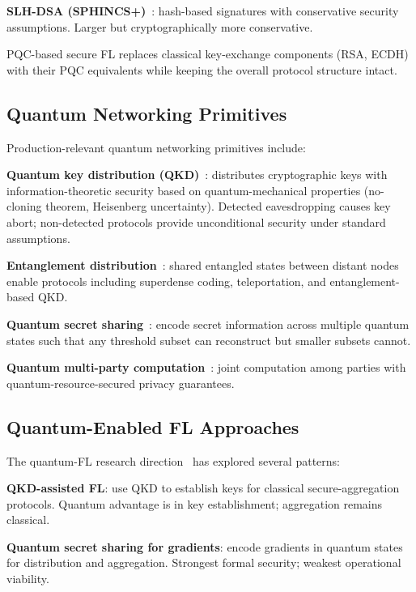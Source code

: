 \documentclass[sigconf,nonacm]{acmart}
\begin{document}
\textbf{SLH-DSA (SPHINCS+)}~\cite{nist2024fips205}:
hash-based signatures with conservative security assumptions.
Larger but cryptographically more conservative.

PQC-based secure FL replaces classical key-exchange components
(RSA, ECDH) with their PQC equivalents while keeping the
overall protocol structure intact.

\subsection{Quantum Networking Primitives}

Production-relevant quantum networking primitives include:

\textbf{Quantum key distribution (QKD)}~\cite{bennett1984bb84,
diamanti2024qkdsurvey}: distributes cryptographic keys with
information-theoretic security based on quantum-mechanical
properties (no-cloning theorem, Heisenberg uncertainty).
Detected eavesdropping causes key abort; non-detected protocols
provide unconditional security under standard assumptions.

\textbf{Entanglement distribution}~\cite{pompili2024entanglement}:
shared entangled states between distant nodes enable protocols
including superdense coding, teleportation, and entanglement-based
QKD.

\textbf{Quantum secret sharing}~\cite{hillery1999qss,
bell2024qsharing}: encode secret information across multiple
quantum states such that any threshold subset can reconstruct
but smaller subsets cannot.

\textbf{Quantum multi-party computation}~\cite{crepeau2024qmpc}:
joint computation among parties with quantum-resource-secured
privacy guarantees.

\subsection{Quantum-Enabled FL Approaches}

The quantum-FL research direction~\cite{huang2024qfedsurv,
jain2024qfedl} has explored several patterns:

\textbf{QKD-assisted FL}: use QKD to establish keys for classical
secure-aggregation protocols. Quantum advantage is in key
establishment; aggregation remains classical.

\textbf{Quantum secret sharing for gradients}: encode gradients
in quantum states for distribution and aggregation. Strongest
formal security; weakest operational viability.
\end{document}
